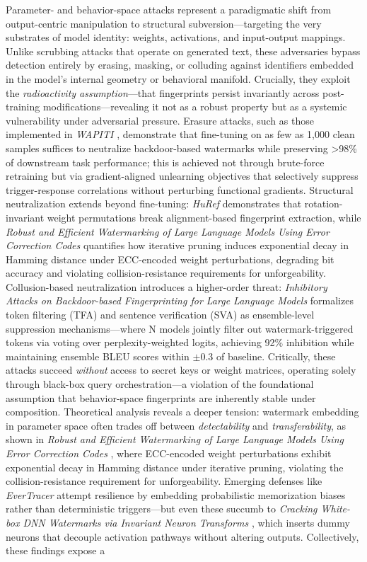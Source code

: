 \documentclass[11pt,a4paper]{article}
\begin{document}
Parameter- and behavior-space attacks represent a paradigmatic shift from output-centric manipulation to structural subversion---targeting the very substrates of model identity: weights, activations, and input-output mappings. Unlike scrubbing attacks that operate on generated text, these adversaries bypass detection entirely by erasing, masking, or colluding against identifiers embedded in the model's internal geometry or behavioral manifold. Crucially, they exploit the \emph{radioactivity assumption}---that fingerprints persist invariantly across post-training modifications---revealing it not as a robust property but as a systemic vulnerability under adversarial pressure. Erasure attacks, such as those implemented in \emph{WAPITI} \cite{arxiv:2506.23731}, demonstrate that fine-tuning on as few as 1,000 clean samples suffices to neutralize backdoor-based watermarks while preserving >98\% of downstream task performance; this is achieved not through brute-force retraining but via gradient-aligned unlearning objectives that selectively suppress trigger-response correlations without perturbing functional gradients. Structural neutralization extends beyond fine-tuning: \emph{HuRef} \cite{arxiv:2407.10887} demonstrates that rotation-invariant weight permutations break alignment-based fingerprint extraction, while \emph{Robust and Efficient Watermarking of Large Language Models Using Error Correction Codes} \cite{doi:10.56553/popets-2025-0126} quantifies how iterative pruning induces exponential decay in Hamming distance under ECC-encoded weight perturbations, degrading bit accuracy and violating collision-resistance requirements for unforgeability. Collusion-based neutralization introduces a higher-order threat: \emph{Inhibitory Attacks on Backdoor-based Fingerprinting for Large Language Models} \cite{arxiv:2601.04261} formalizes token filtering (TFA) and sentence verification (SVA) as ensemble-level suppression mechanisms---where N models jointly filter out watermark-triggered tokens via voting over perplexity-weighted logits, achieving 92\% inhibition while maintaining ensemble BLEU scores within $\pm$0.3 of baseline. Critically, these attacks succeed \emph{without} access to secret keys or weight matrices, operating solely through black-box query orchestration---a violation of the foundational assumption that behavior-space fingerprints are inherently stable under composition. Theoretical analysis reveals a deeper tension: watermark embedding in parameter space often trades off between \emph{detectability} and \emph{transferability}, as shown in \emph{Robust and Efficient Watermarking of Large Language Models Using Error Correction Codes} \cite{doi:10.56553/popets-2025-0126}, where ECC-encoded weight perturbations exhibit exponential decay in Hamming distance under iterative pruning, violating the collision-resistance requirement for unforgeability. Emerging defenses like \emph{EverTracer} \cite{arxiv:2601.14311} attempt resilience by embedding probabilistic memorization biases rather than deterministic triggers---but even these succumb to \emph{Cracking White-box DNN Watermarks via Invariant Neuron Transforms} \cite{doi:10.1145/3580305.3599291}, which inserts dummy neurons that decouple activation pathways without altering outputs. Collectively, these findings expose a 
\end{document}
